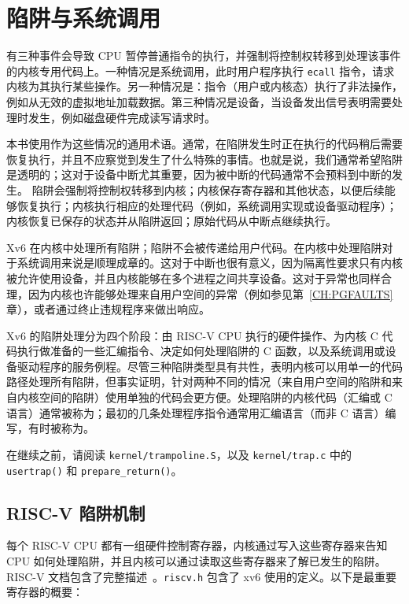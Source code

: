 \chapter{陷阱与系统调用}
\label{CH:TRAP}

有三种事件会导致 CPU 暂停普通指令的执行，并强制将控制权转移到处理该事件的内核专用代码上。一种情况是系统调用，此时用户程序执行 {\tt ecall} 指令，请求内核为其执行某些操作。另一种情况是：指令（用户或内核态）执行了非法操作，例如从无效的虚拟地址加载数据。第三种情况是设备，当设备发出信号表明需要处理时发生，例如磁盘硬件完成读写请求时。

本书使用作为这些情况的通用术语。通常，在陷阱发生时正在执行的代码稍后需要恢复执行，并且不应察觉到发生了什么特殊的事情。也就是说，我们通常希望陷阱是透明的；这对于设备中断尤其重要，因为被中断的代码通常不会预料到中断的发生。
陷阱会强制将控制权转移到内核；内核保存寄存器和其他状态，以便后续能够恢复执行；内核执行相应的处理代码（例如，系统调用实现或设备驱动程序）；内核恢复已保存的状态并从陷阱返回；原始代码从中断点继续执行。

Xv6 在内核中处理所有陷阱；陷阱不会被传递给用户代码。在内核中处理陷阱对于系统调用来说是顺理成章的。这对于中断也很有意义，因为隔离性要求只有内核被允许使用设备，并且内核能够在多个进程之间共享设备。这对于异常也同样合理，因为内核也许能够处理来自用户空间的异常（例如参见第~\ref{CH:PGFAULTS} 章），或者通过终止违规程序来做出响应。

Xv6 的陷阱处理分为四个阶段：由 RISC-V CPU 执行的硬件操作、为内核 C 代码执行做准备的一些汇编指令、决定如何处理陷阱的 C 函数，以及系统调用或设备驱动程序的服务例程。尽管三种陷阱类型具有共性，表明内核可以用单一的代码路径处理所有陷阱，但事实证明，针对两种不同的情况（来自用户空间的陷阱和来自内核空间的陷阱）使用单独的代码会更方便。处理陷阱的内核代码（汇编或 C 语言）通常被称为；最初的几条处理程序指令通常用汇编语言（而非 C 语言）编写，有时被称为。

在继续之前，请阅读 {\tt kernel/trampoline.S}，以及 {\tt kernel/trap.c} 中的 {\tt usertrap()} 和 {\tt prepare\_return()}。

\section{RISC-V 陷阱机制}

每个 RISC-V CPU 都有一组硬件控制寄存器，内核通过写入这些寄存器来告知 CPU 如何处理陷阱，并且内核可以通过读取这些寄存器来了解已发生的陷阱。RISC-V 文档包含了完整描述~\cite{riscv:priv}。{\tt riscv.h}  包含了 xv6 使用的定义。以下是最重要寄存器的概要：

